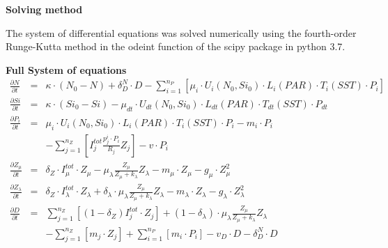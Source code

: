 {\bf {Solving method}}

The system of differential equations was solved numerically using the fourth-order Runge-Kutta method in the odeint function of the scipy package in python 3.7. 



{\bf {Full System of equations}}
\begin{eqnarray*}
\frac{\partial N}{\partial t} & = & 
\kappa \cdot \left(N_{0} - N\right) + 
\delta^{N}_{D} \cdot D -
\sum_{i=1}^{n_P} [\mu_i \cdot U_{i}(N_0,Si_0)\cdot L_i(PAR)\cdot T_i(SST) \cdot P_{i}] 
\nonumber \\
\frac{\partial Si}{\partial t} & = & 
\kappa \cdot \left(Si_{0} - Si\right) 
- \mu_{dt} \cdot U_{dt}(N_0,Si_0) \cdot L_{dt}(PAR)\cdot T_{dt}(SST) \cdot P_{dt}
\nonumber \\
\frac{\partial P_{i}}{\partial t} & = & 
\mu_{i} \cdot U_{i}(N_0,Si_0)\cdot L_{i}(PAR)\cdot T_{i}(SST) \cdot P_{i}
- m_{i} \cdot P_{i} \\
&& - \sum_{j=1}^{n_Z} [I^{tot}_j \frac{p^i_{j} \cdot P_{i}} {R_{j}} Z_{j}] -
v\cdot P_{i} 
\nonumber \\
\frac{\partial Z_{\mu}}{\partial t} & = & 
\delta_Z \cdot I^{tot}_{\mu} \cdot Z_{\mu}-
\mu^{}_{\lambda} \frac{Z_{\mu}}{Z_{\mu}+k_{\lambda}} Z_{\lambda}-
m_{\mu} \cdot Z_{\mu} - 
g_{\mu} \cdot Z_{\mu}^{2}
\nonumber \\
\frac{\partial Z_{\lambda}}{\partial t} & = & 
\delta_Z \cdot I^{tot}_{\lambda} \cdot Z_{\lambda}+
\delta_{\lambda} \cdot \mu^{}_{\lambda} \frac{Z_{\mu}}{Z_{\mu}+k_{\lambda}} Z_{\lambda}-
m_{\lambda} \cdot Z_{\lambda} - 
g_{\lambda} \cdot Z_{\lambda}^{2}
\nonumber \\
\frac{\partial D}{\partial t} & = & 
\sum_{j=1}^{n_Z} [(1-\delta_Z) I^{tot}_j \cdot Z_{j}] +
(1-\delta_{\lambda}) \cdot \mu^{}_{\lambda} \frac{Z_{\mu}}{Z_{\mu}+k_{\lambda}} Z_{\lambda} \\
&& -\sum_{j=1}^{n_Z} [m_j \cdot Z_{j}] +
\sum_{i=1}^{n_P} [m_i \cdot P_{i}] -
v_{D} \cdot D -
\delta^{N}_{D} \cdot D
\nonumber
\end{eqnarray*}
 
